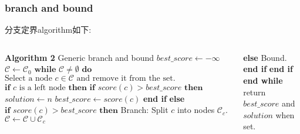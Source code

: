 \begin{frame}[fragile]
\frametitle{branch and bound}
分支定界algorithm如下:
\begin{columns}
\begin{algorithmic}[1]
\State \textbf{Algorithm 2} Generic branch and bound
\State $best\_score \leftarrow - \infty$
\State $\mathcal{C} \leftarrow \mathcal{C}_0$
\State $\textbf{while } \mathcal{C} \neq \emptyset \textbf{ do}$
\State \quad $\text{Select a node } c \in \mathcal{C} \text{ and remove it from the set.}$
\State \quad $\textbf{if } c \text{ is a left node } \textbf{then}$
\State \qquad $\textbf{if } score(c) > best\_score \textbf{ then} $
\State \qquad \quad $solution \leftarrow n$
\State \qquad \quad $best\_score \leftarrow score(c)$
\State \qquad \textbf{end if}
\State \quad \textbf{else}
\State \qquad $\textbf{if } score(c) > best\_score \textbf{ then}$
\State \qquad \quad Branch: Split $c$ into nodes $\mathcal{C}_c$.
\State \qquad \quad $\mathcal{C} \leftarrow \mathcal{C} \cup \mathcal{C}_c$

\end{algorithmic}

\begin{algorithmic}[1]

\State \qquad \textbf{else}
\State \qquad \quad Bound.
\State \qquad \textbf{end if}
\State \quad \textbf{end if}
\State \textbf{end while}
\State return $best\_score $ and $solution$ when set.

\end{algorithmic}

\end{columns}
\end{frame}


